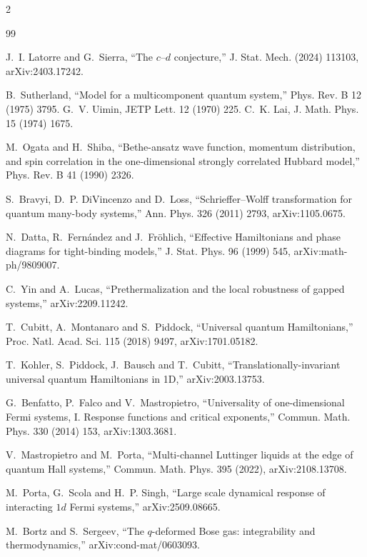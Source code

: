 \documentclass[11pt]{article}
\theoremstyle{definition}
\begin{document}
\begin{multicols}{2}\raggedright
\begin{thebibliography}{99}\footnotesize\setlength{\itemsep}{0pt}\setlength{\parskip}{0pt}

 J.~I. Latorre and G.~Sierra, ``The $c$--$d$ conjecture,'' J. Stat. Mech. (2024) 113103, arXiv:2403.17242.

 B.~Sutherland, ``Model for a multicomponent quantum system,'' Phys. Rev. B 12 (1975) 3795. G.~V. Uimin, JETP Lett. 12 (1970) 225. C.~K. Lai, J. Math. Phys. 15 (1974) 1675.

 M.~Ogata and H.~Shiba, ``Bethe-ansatz wave function, momentum distribution, and spin correlation in the one-dimensional strongly correlated Hubbard model,'' Phys. Rev. B 41 (1990) 2326.

 S.~Bravyi, D.~P. DiVincenzo and D.~Loss, ``Schrieffer--Wolff transformation for quantum many-body systems,'' Ann. Phys. 326 (2011) 2793, arXiv:1105.0675.

 N.~Datta, R.~Fern\'andez and J.~Fr\"ohlich, ``Effective Hamiltonians and phase diagrams for tight-binding models,'' J. Stat. Phys. 96 (1999) 545, arXiv:math-ph/9809007.

 C.~Yin and A.~Lucas, ``Prethermalization and the local robustness of gapped systems,'' arXiv:2209.11242.

 T.~Cubitt, A.~Montanaro and S.~Piddock, ``Universal quantum Hamiltonians,'' Proc. Natl. Acad. Sci. 115 (2018) 9497, arXiv:1701.05182.

 T.~Kohler, S.~Piddock, J.~Bausch and T.~Cubitt, ``Translationally-invariant universal quantum Hamiltonians in 1D,'' arXiv:2003.13753.

 G.~Benfatto, P.~Falco and V.~Mastropietro, ``Universality of one-dimensional Fermi systems, I. Response functions and critical exponents,'' Commun. Math. Phys. 330 (2014) 153, arXiv:1303.3681.

 V.~Mastropietro and M.~Porta, ``Multi-channel Luttinger liquids at the edge of quantum Hall systems,'' Commun. Math. Phys. 395 (2022), arXiv:2108.13708.

 M.~Porta, G.~Scola and H.~P. Singh, ``Large scale dynamical response of interacting $1d$ Fermi systems,'' arXiv:2509.08665.

 M.~Bortz and S.~Sergeev, ``The $q$-deformed Bose gas: integrability and thermodynamics,'' arXiv:cond-mat/0603093.


\end{thebibliography}
\end{multicols}
\end{document}
